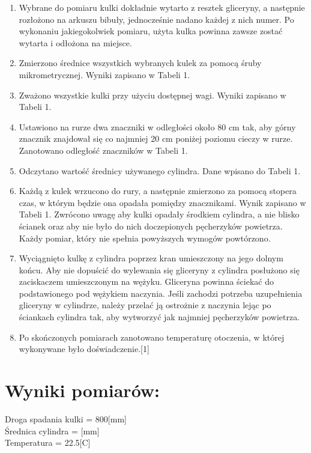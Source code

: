 \documentclass{article}
\begin{document}
\begin{enumerate}
    \item Wybrane do pomiaru kulki dokładnie wytarto z resztek gliceryny, a następnie rozłożono na arkuszu bibuły, jednocześnie nadano każdej z nich numer. Po wykonaniu jakiegokolwiek pomiaru, użyta kulka powinna zawsze zostać wytarta i odłożona na miejsce.
    
    \item Zmierzono średnice wszystkich wybranych kulek za pomocą śruby mikrometrycznej. Wyniki zapisano w Tabeli 1.
    
    \item Zważono wszystkie kulki przy użyciu dostępnej wagi. Wyniki zapisano w Tabeli 1.
    
    \item Ustawiono na rurze dwa znaczniki w odległości około 80 cm tak, aby górny znacznik znajdował się co najmniej 20 cm poniżej poziomu cieczy w rurze. Zanotowano odległość znaczników w Tabeli 1.
    
    \item Odczytano wartość średnicy używanego cylindra. Dane wpisano do Tabeli 1.
    
    \item Każdą z kulek wrzucono do rury, a następnie zmierzono za pomocą stopera czas, w którym będzie ona opadała pomiędzy znacznikami. Wynik zapisano w Tabeli 1. Zwrócono uwagę aby kulki opadały środkiem cylindra, a nie blisko ścianek oraz aby nie było do nich doczepionych pęcherzyków powietrza. Każdy pomiar, który nie spełnia powyższych wymogów powtórzono.
    
    \item Wyciągnięto kulkę z cylindra poprzez kran umieszczony na jego dolnym końcu. Aby nie dopuścić do wylewania się gliceryny z cylindra posłużono się zaciskaczem umieszczonym na wężyku. Gliceryna powinna ściekać do podstawionego pod wężykiem naczynia. Jeśli zachodzi potrzeba uzupełnienia gliceryny w cylindrze, należy przelać ją ostrożnie z naczynia lejąc po ściankach cylindra tak, aby wytworzyć jak najmniej pęcherzyków powietrza.
    
    \item Po skończonych pomiarach zanotowano temperaturę otoczenia, w której wykonywane było doświadczenie.[1]
\end{enumerate}



\section{Wyniki pomiarów:}
Droga spadania kulki = 800[mm]\\
Średnica cylindra = [mm]\\
Temperatura = 22.5[C]
\end{document}
